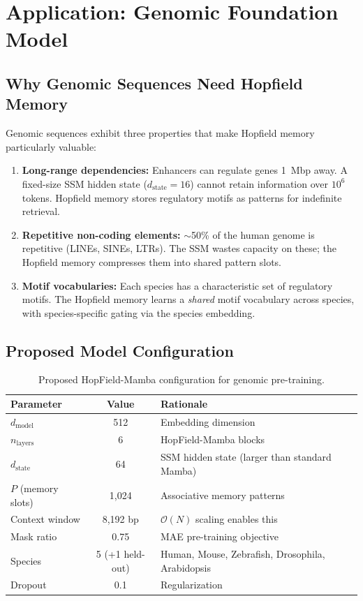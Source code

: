 \documentclass[11pt,a4paper]{article}
\numberwithin{equation}{section}
\begin{document}
\section{Application: Genomic Foundation Model}
\label{sec:genomic}

\subsection{Why Genomic Sequences Need Hopfield Memory}

Genomic sequences exhibit three properties that make Hopfield memory particularly
valuable:

\begin{enumerate}
    \item \textbf{Long-range dependencies:} Enhancers can regulate genes 1~Mbp away.
    A fixed-size SSM hidden state ($d_{\text{state}} = 16$) cannot retain information
    over $10^6$ tokens. Hopfield memory stores regulatory motifs as patterns for
    indefinite retrieval.
    \item \textbf{Repetitive non-coding elements:} $\sim$50\% of the human genome is
    repetitive (LINEs, SINEs, LTRs). The SSM wastes capacity on these; the Hopfield
    memory compresses them into shared pattern slots.
    \item \textbf{Motif vocabularies:} Each species has a characteristic set of
    regulatory motifs. The Hopfield memory learns a \emph{shared} motif vocabulary
    across species, with species-specific gating via the species embedding.
\end{enumerate}

\subsection{Proposed Model Configuration}

\begin{table}[H]
\centering
\caption{Proposed HopField-Mamba configuration for genomic pre-training.}
\label{tab:config}
\small
\begin{tabular}{lcl}
\toprule
\textbf{Parameter} & \textbf{Value} & \textbf{Rationale} \\
\midrule
$d_{\text{model}}$ & 512 & Embedding dimension \\
$n_{\text{layers}}$ & 6 & HopField-Mamba blocks \\
$d_{\text{state}}$ & 64 & SSM hidden state (larger than standard Mamba) \\
$P$ (memory slots) & 1,024 & Associative memory patterns \\
Context window & 8,192 bp & $\mathcal{O}(N)$ scaling enables this \\
Mask ratio & 0.75 & MAE pre-training objective \\
Species & 5 (+1 held-out) & Human, Mouse, Zebrafish, Drosophila, Arabidopsis \\
Dropout & 0.1 & Regularization \\
\bottomrule
\end{tabular}
\end{table}
\end{document}
